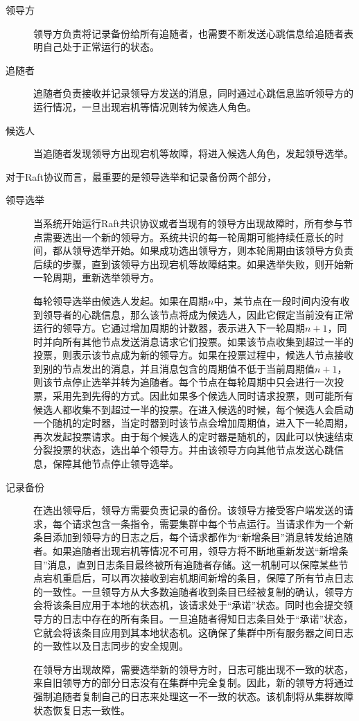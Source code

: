 \begin{description}
  \item[领导方] 领导方负责将记录备份给所有追随者，也需要不断发送心跳信息给追随者表明自己处于正常运行的状态。
  \item[追随者] 追随者负责接收并记录领导方发送的消息，同时通过心跳信息监听领导方的运行情况，一旦出现宕机等情况则转为候选人角色。
  \item[候选人] 当追随者发现领导方出现宕机等故障，将进入候选人角色，发起领导选举。
\end{description}

对于Raft协议而言，最重要的是领导选举和记录备份两个部分，

\begin{description}
  \item[领导选举] 当系统开始运行Raft共识协议或者当现有的领导方出现故障时，所有参与节点需要选出一个新的领导方。系统共识的每一轮周期可能持续任意长的时间，都从领导选举开始。如果成功选出领导方，则本轮周期由该领导方负责后续的步骤，直到该领导方出现宕机等故障结束。如果选举失败，则开始新一轮周期，重新选举领导方。

  每轮领导选举由候选人发起。如果在周期$n$中，某节点在一段时间内没有收到领导者的心跳信息，那么该节点将成为候选人，因此它假定当前没有正常运行的领导方。它通过增加周期的计数器，表示进入下一轮周期$n+1$，同时并向所有其他节点发送消息请求它们投票。如果该节点收集到超过一半的投票，则表示该节点成为新的领导方。如果在投票过程中，候选人节点接收到别的节点发出的消息，并且消息包含的周期值不低于当前周期值$n+1$，则该节点停止选举并转为追随者。每个节点在每轮周期中只会进行一次投票，采用先到先得的方式。因此如果多个候选人同时请求投票，则可能所有候选人都收集不到超过一半的投票。在进入候选的时候，每个候选人会启动一个随机的定时器，当定时器到时该节点会增加周期值，进入下一轮周期，再次发起投票请求。由于每个候选人的定时器是随机的，因此可以快速结束分裂投票的状态，选出单个领导方。并由该领导方向其他节点发送心跳信息，保障其他节点停止领导选举。
  \item[记录备份] 在选出领导后，领导方需要负责记录的备份。该领导方接受客户端发送的请求，每个请求包含一条指令，需要集群中每个节点运行。当请求作为一个新条目添加到领导方的日志之后，每个请求都作为“新增条目”消息转发给追随者。如果追随者出现宕机等情况不可用，领导方将不断地重新发送“新增条目”消息，直到日志条目最终被所有追随者存储。这一机制可以保障某些节点宕机重启后，可以再次接收到宕机期间新增的条目，保障了所有节点日志的一致性。一旦领导方从大多数追随者收到条目已经被复制的确认，领导方会将该条目应用于本地的状态机，该请求处于“承诺”状态。同时也会提交领导方的日志中存在的所有条目。一旦追随者得知日志条目处于“承诺”状态，它就会将该条目应用到其本地状态机。这确保了集群中所有服务器之间日志的一致性以及日志同步的安全规则。

  在领导方出现故障，需要选举新的领导方时，日志可能出现不一致的状态，来自旧领导方的部分日志没有在集群中完全复制。因此，新的领导方将通过强制追随者复制自己的日志来处理这一不一致的状态。该机制将从集群故障状态恢复日志一致性。
\end{description}

